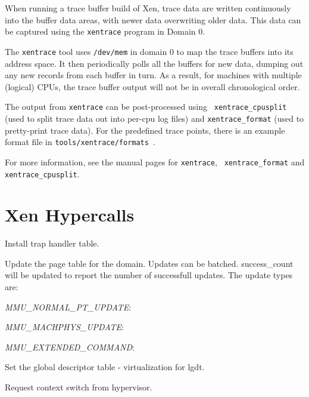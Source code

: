 \documentclass[11pt,twoside,final,openright]{xenstyle}
\begin{document}
When running a trace buffer build of Xen, trace data are written continuously
into the buffer data areas, with newer data overwriting older data.  This data
can be captured using the {\tt xentrace} program in Domain 0.

The {\tt xentrace} tool uses {\tt /dev/mem} in domain 0 to map the trace
buffers into its address space.  It then periodically polls all the buffers for
new data, dumping out any new records from each buffer in turn.  As a result,
for machines with multiple (logical) CPUs, the trace buffer output will not be
in overall chronological order.

The output from {\tt xentrace} can be post-processed using {\tt
xentrace\_cpusplit} (used to split trace data out into per-cpu log files) and
{\tt xentrace\_format} (used to pretty-print trace data).  For the predefined
trace points, there is an example format file in {\tt tools/xentrace/formats }.

For more information, see the manual pages for {\tt xentrace}, {\tt
xentrace\_format} and {\tt xentrace\_cpusplit}.


\appendix

\newcommand{\hypercall}[1]{\vspace{5mm}{\large\sf #1}}

\chapter{Xen Hypercalls}

\hypercall{ set\_trap\_table(trap\_info\_t *table)} 

Install trap handler table.


\hypercall{ mmu\_update(mmu\_update\_t *req, int count, int *success\_count)} 

Update the page table for the domain. Updates can be batched.
success\_count will be updated to report the number of successfull
updates.  The update types are:

{\it MMU\_NORMAL\_PT\_UPDATE}:

{\it MMU\_MACHPHYS\_UPDATE}:

{\it MMU\_EXTENDED\_COMMAND}:


\hypercall{ set\_gdt(unsigned long *frame\_list, int entries)} 

Set the global descriptor table - virtualization for lgdt.


\hypercall{ stack\_switch(unsigned long ss, unsigned long esp)} 

Request context switch from hypervisor.
\end{document}
